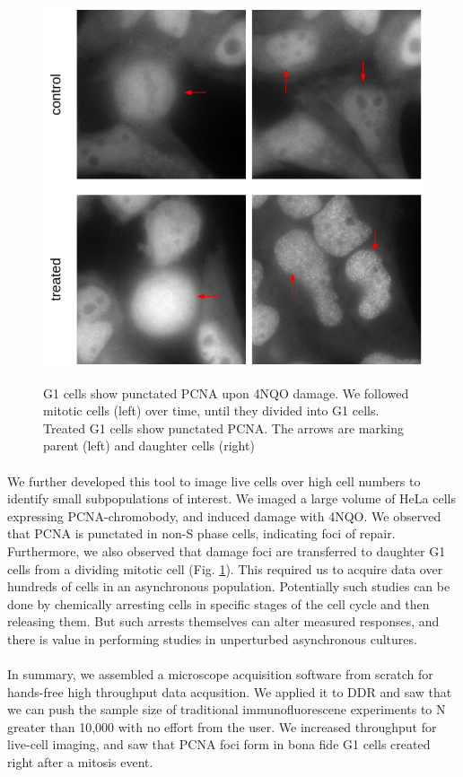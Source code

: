 \begin{figure}[H]
    {\hfill\includegraphics[clip, width=0.8\linewidth]{figures/g1.png}\hspace*{\fill}}
    \caption{G1 cells show punctated PCNA upon 4NQO damage. We followed mitotic cells (left) over time, until they divided into G1 cells. Treated G1 cells show punctated PCNA. The arrows are marking parent (left) and daughter cells (right)}
    {\label{fig:g1}}
\end{figure}

\paragraph*{} We further developed this tool to image live cells over high cell numbers to identify small subpopulations of interest. We imaged a large volume of HeLa cells expressing PCNA-chromobody, and induced damage with 4NQO. We observed that PCNA is punctated in non-S phase cells, indicating foci of repair. Furthermore, we also observed that damage foci are transferred to daughter G1 cells from a dividing mitotic cell (Fig. \ref{fig:g1}). This required us to acquire data over hundreds of cells in an asynchronous population. Potentially such studies can be done by chemically arresting cells in specific stages of the cell cycle and then releasing them. But such arrests themselves can alter measured responses, and there is value in performing studies in unperturbed asynchronous cultures.

\paragraph*{} In summary, we assembled a microscope acquisition software from scratch for hands-free high throughput data acqusition. We applied it to DDR and saw that we can push the sample size of traditional immunofluorescene experiments to N greater than 10,000 with no effort from the user. We increased throughput for live-cell imaging, and saw that PCNA foci form in bona fide G1 cells created right after a mitosis event.
